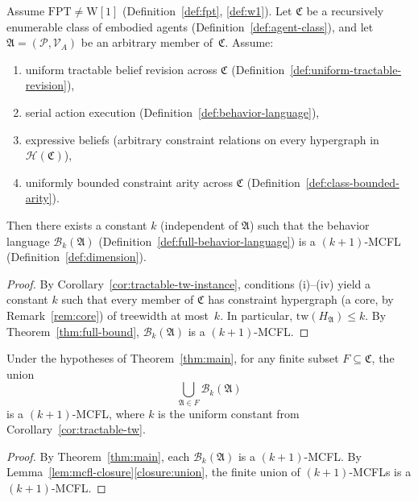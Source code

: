 \documentclass[runningheads]{llncs}
\begin{document}
\begin{theorem}\label{thm:main}
Assume $\mathrm{FPT} \neq \mathrm{W}[1]$ (Definition~\ref{def:fpt}, \ref{def:w1}).
Let $\mathfrak{C}$ be a recursively enumerable class of embodied agents (Definition~\ref{def:agent-class}), and let $\mathfrak{A} = (\mathcal{P}, \mathcal{V}_A)$ be an arbitrary member of~$\mathfrak{C}$.
Assume:
\begin{enumerate}[nosep,label=(\roman*)]
  \item uniform tractable belief revision across $\mathfrak{C}$ (Definition~\ref{def:uniform-tractable-revision}),
  \item serial action execution (Definition~\ref{def:behavior-language}),
  \item expressive beliefs (arbitrary constraint relations on every hypergraph in $\mathcal{H}(\mathfrak{C})$),
  \item uniformly bounded constraint arity across $\mathfrak{C}$ (Definition~\ref{def:class-bounded-arity}).
\end{enumerate}
Then there exists a constant $k$ (independent of $\mathfrak{A}$) such that the behavior language $\mathcal{B}_k(\mathfrak{A})$ (Definition~\ref{def:full-behavior-language}) is a $(k{+}1)$-MCFL (Definition~\ref{def:dimension}).
\end{theorem}

\begin{proof}
By Corollary~\ref{cor:tractable-tw-instance}, conditions (i)--(iv) yield a constant $k$ such that every member of $\mathfrak{C}$ has constraint hypergraph (a core, by Remark~\ref{rem:core}) of treewidth at most~$k$.
In particular, $\mathrm{tw}(H_{\mathfrak{A}}) \leq k$.
By Theorem~\ref{thm:full-bound}, $\mathcal{B}_k(\mathfrak{A})$ is a $(k{+}1)$-MCFL.
\end{proof}

\begin{theorem}\label{thm:main-finite}
Under the hypotheses of Theorem~\ref{thm:main}, for any finite subset $F \subseteq \mathfrak{C}$, the union
\[
  \bigcup_{\mathfrak{A} \in F} \mathcal{B}_k(\mathfrak{A})
\]
is a $(k{+}1)$-MCFL, where $k$ is the uniform constant from Corollary~\ref{cor:tractable-tw}.
\end{theorem}

\begin{proof}
By Theorem~\ref{thm:main}, each $\mathcal{B}_k(\mathfrak{A})$ is a $(k{+}1)$-MCFL.
By Lemma~\ref{lem:mcfl-closure}\ref{closure:union}, the finite union of $(k{+}1)$-MCFLs is a $(k{+}1)$-MCFL.
\end{proof}
\end{document}
